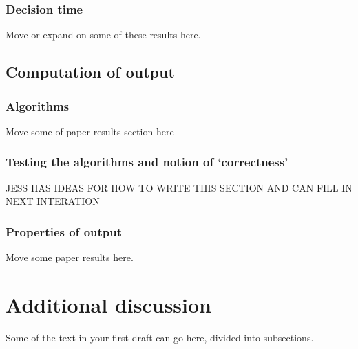 \documentclass{article}
\begin{document}
\subsubsection*{Decision time}
Move or expand on some of these results here. 

\subsection*{Computation of output}
\subsubsection*{Algorithms }
Move some of paper results section here

\subsubsection*{Testing the algorithms and notion of `correctness' }
JESS HAS IDEAS FOR HOW TO WRITE THIS SECTION AND CAN FILL IN NEXT INTERATION

\subsubsection*{Properties of output }
Move some paper results here.

\section*{Additional discussion}
Some of the text in your first draft can go here, divided into subsections.
\label{additionaldiscussion}
\end{document}
